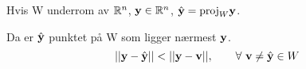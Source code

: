 Hvis W underrom av $\mathbb{R}^n$, $\mathbf{y}\in\mathbb{R}^n$, $\hat{\mathbf{y}}=\text{proj}_W\mathbf{y}$.

Da er $\hat{\mathbf{y}}$ punktet på W som ligger nærmest $\mathbf{y}$.
$$||\mathbf{y} - \hat{\mathbf{y}}|| < ||\mathbf{y} - \mathbf{v}||,
  \qquad \forall\ \mathbf{v}\neq\hat{\mathbf{y}}\in W$$
